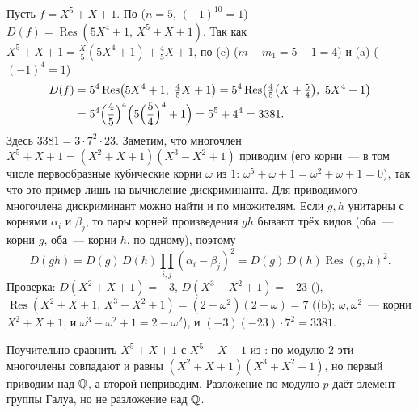 \begin{example}[4.38]
Пусть $f=X^5+X+1$. По  ($n=5$, $(-1)^{10}=1$) $D(f)=\operatorname{Res}(5X^4+1,\,X^5+X+1)$. Так как
$X^5+X+1=\frac X5(5X^4+1)+\frac45X+1$, по (c) ($m-m_1=5-1=4$) и (a) ($(-1)^4=1$)
\begin{align*}
D(f)&=5^4\operatorname{Res}\bigl(5X^4+1,\ \tfrac45X+1\bigr)=5^4\operatorname{Res}\bigl(\tfrac45\bigl(X+\tfrac54\bigr),\ 5X^4+1\bigr)\\
&=5^4\Bigl(\frac45\Bigr)^4\Bigl(5\Bigl(\frac54\Bigr)^4+1\Bigr)=5^5+4^4=3381 .
\end{align*}
Здесь $3381=3\cdot7^2\cdot23$. Заметим, что многочлен $X^5+X+1=(X^2+X+1)(X^3-X^2+1)$ приводим (его корни~--- в том числе
первообразные кубические корни $\omega$ из $1$: $\omega^5+\omega+1=\omega^2+\omega+1=0$), так что это пример лишь на
вычисление дискриминанта. Для приводимого многочлена дискриминант можно найти и по множителям. Если $g,h$ унитарны с
корнями $\alpha_i$ и $\beta_j$, то пары корней произведения $gh$ бывают трёх видов (оба~--- корни $g$, оба~--- корни $h$,
по одному), поэтому
\[
D(gh)=D(g)\,D(h)\prod_{i,j}(\alpha_i-\beta_j)^2=D(g)\,D(h)\operatorname{Res}(g,h)^2 .
\]
Проверка: $D(X^2+X+1)=-3$, $D(X^3-X^2+1)=-23$ (), $\operatorname{Res}(X^2+X+1,\,X^3-X^2+1)=(2-\omega^2)(2-\omega)=7$
((b); $\omega,\omega^2$~--- корни $X^2+X+1$, и $\omega^3-\omega^2+1=2-\omega^2$), и $(-3)(-23)\cdot7^2=3381$.

Поучительно сравнить $X^5+X+1$ с $X^5-X-1$ из : по модулю $2$ эти многочлены совпадают и
равны $(X^2+X+1)(X^3+X^2+1)$, но первый приводим над $\mathbb Q$, а второй неприводим. Разложение по модулю $p$ даёт
элемент группы Галуа, но не разложение над $\mathbb Q$.
\end{example}

